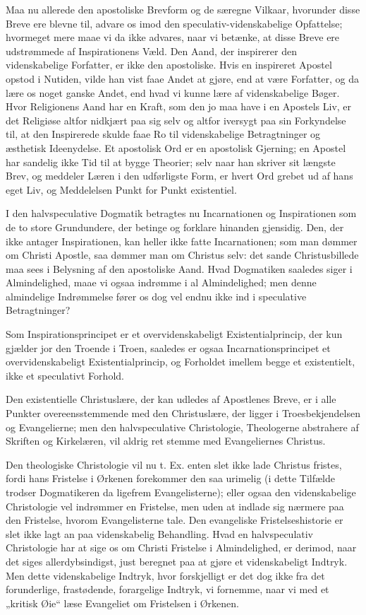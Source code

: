 \documentclass[12pt,a4paper]{book}
\newcommand{\opage}[1]{\marginnote{\footnotesize\textit{[#1]}}}
\begin{document}
Maa nu allerede den apostoliske Brevform og de særegne Vilkaar, hvorunder
disse Breve ere blevne til, advare os imod den speculativ-videnskabelige
Opfattelse; hvormeget mere maae vi da ikke advares, naar vi betænke, at
disse Breve ere udstrømmede af Inspirationens Væld. Den Aand, der
inspirerer den videnskabelige Forfatter, er ikke den apostoliske. Hvis en
inspireret Apostel opstod i Nutiden, vilde han vist faae Andet at gjøre,
end at være Forfatter, og da lære os noget ganske Andet, end hvad vi kunne
lære af videnskabelige Bøger. Hvor Religionens Aand har en Kraft, som den
jo maa have i en Apostels Liv, er det Religiøse altfor nidkjært paa sig
selv og altfor iversygt paa sin Forkyndelse til, at den Inspirerede skulde
faae Ro til videnskabelige Betragtninger og æsthetisk Ideenydelse. Et
apostolisk Ord er en apostolisk Gjerning; en Apostel har sandelig ikke Tid
til at bygge Theorier; selv naar han skriver sit længste Brev, og meddeler
Læren i den udførligste Form, er hvert Ord grebet ud af hans eget Liv, og
Meddelelsen Punkt for Punkt existentiel.

I den halvspeculative Dogmatik betragtes nu Incarnationen og Inspirationen
som de to store Grundundere, der betinge og forklare hinanden gjensidig.
Den, der ikke antager Inspirationen, kan heller ikke fatte Incarnationen;
som man dømmer om Christi Apostle, saa dømmer man om Christus selv: det
sande Christusbillede maa sees i Belysning af den apostoliske Aand. Hvad
Dogmatiken saaledes siger i Almindelighed, maae vi ogsaa indrømme
\opage{107} i al Almindelighed; men denne almindelige Indrømmelse fører os dog
vel endnu ikke ind i speculative Betragtninger?

Som Inspirationsprincipet er et overvidenskabeligt Existentialprincip, der
kun gjælder jor den Troende i Troen, saaledes er ogsaa
Incarnationsprincipet et overvidenskabeligt Existentialprincip, og
Forholdet imellem begge et existentielt, ikke et speculativt Forhold.

Den existentielle Christuslære, der kan udledes af Apostlenes Breve, er i
alle Punkter overeensstemmende med den Christuslære, der ligger i
Troesbekjendelsen og Evangelierne; men den halvspeculative Christologie,
Theologerne abstrahere af Skriften og Kirkelæren, vil aldrig ret stemme med
Evangeliernes Christus.

Den theologiske Christologie vil nu t. Ex. enten slet ikke lade Christus
fristes, fordi hans Fristelse i Ørkenen forekommer den saa urimelig (i
dette Tilfælde trodser Dogmatikeren da ligefrem Evangelisterne); eller
ogsaa den videnskabelige Christologie vel indrømmer en Fristelse, men uden
at indlade sig nærmere paa den Fristelse, hvorom Evangelisterne tale. Den
evangeliske Fristelseshistorie er slet ikke lagt an paa videnskabelig
Behandling. Hvad en halvspeculativ Christologie har at sige os om Christi
Fristelse i Almindelighed, er derimod, naar det siges allerdybsindigst,
just beregnet paa at gjøre et videnskabeligt Indtryk. Men dette
videnskabelige Indtryk, hvor forskjelligt er det dog ikke fra det
forunderlige, frastødende, forargelige Indtryk, vi fornemme, naar vi med et
„kritisk Øie“ læse Evangeliet om Fristelsen i Ørkenen.
\end{document}
